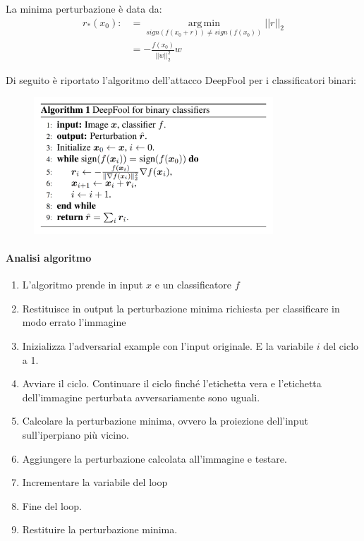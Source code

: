         La minima perturbazione è data da:
            \begin{equation}
                \begin{split}
                    r_*(x_0) :&= \operatorname*{arg\,min}_{sign(f(x_0+r)) \neq sign(f(x_0))} ||r||_2\\
                              &= -\frac{f(x_0)}{||w||_2^2}w
                \end{split}
            \end{equation}
            
        \newpage
        Di seguito è riportato l'algoritmo dell'attacco DeepFool per i classificatori binari:
            \begin{figure}[h!]
                \centering
                \includegraphics[width=0.8\textwidth]{Images/DeepFool/Deepfool_2.png}
                \caption{}
                \label{DeepFool_2}
            \end{figure}
            
            \paragraph{Analisi algoritmo}
                \begin{enumerate}
                    \item L'algoritmo prende in input $x$ e un classificatore $f$
                    \item Restituisce in output la perturbazione minima richiesta per classificare in modo errato l'immagine
                    \item Inizializza l'adversarial example con l'input originale. E la variabile $i$ del ciclo a 1.
                    \item Avviare il ciclo. Continuare il ciclo finché l'etichetta vera e l'etichetta dell'immagine perturbata avversariamente sono uguali.
                    \item Calcolare la perturbazione minima, ovvero la proiezione dell'input sull'iperpiano più vicino.
                    \item Aggiungere la perturbazione calcolata all'immagine e testare.
                    \item Incrementare la variabile del loop
                    \item Fine del loop.
                    \item Restituire la perturbazione minima.
                \end{enumerate}
            \newpage
        
